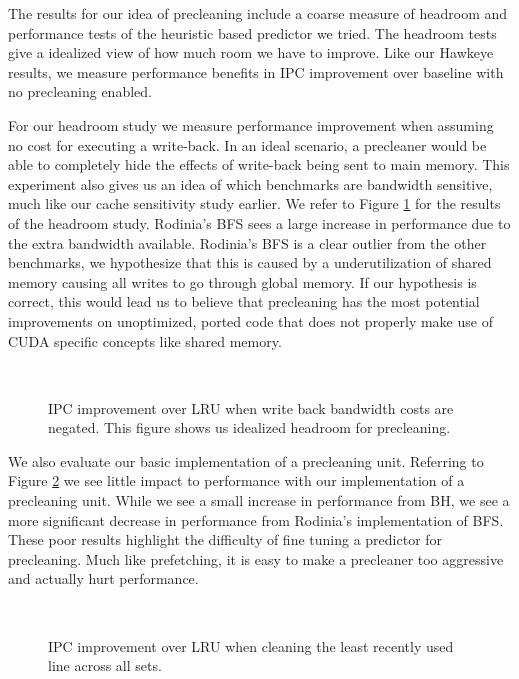 The results for our idea of precleaning include a coarse measure of headroom and performance tests of the heuristic based predictor we tried. The headroom tests give a idealized view of how much room we have to improve. Like our Hawkeye results, we measure performance benefits in IPC improvement over baseline with no precleaning enabled.

For our headroom study we measure performance improvement when assuming no cost for executing a write-back. In an ideal scenario, a precleaner would be able to completely hide the effects of write-back being sent to main memory. This experiment also gives us an idea of which benchmarks are bandwidth sensitive, much like our cache sensitivity study earlier. We refer to Figure \ref{f:preclean_headroom} for the results of the headroom study. Rodinia's BFS sees a large increase in performance due to the extra bandwidth available. Rodinia's BFS is a clear outlier from the other benchmarks, we hypothesize that this is caused by a underutilization of shared memory causing all writes to go through global memory. If our hypothesis is correct, this would lead us to believe that precleaning has the most potential improvements on unoptimized, ported code that does not properly make use of CUDA specific concepts like shared memory.

\begin{figure}[htb]
\begin{center}
\ 
\caption{IPC improvement over LRU when write back bandwidth costs are negated. This figure shows us idealized headroom for precleaning.}
\label{f:preclean_headroom}
\end{center}
\end{figure}

We also evaluate our basic implementation of a precleaning unit. Referring to Figure \ref{f:preclean_perf} we see little impact to performance with our implementation of a precleaning unit. While we see a small increase in performance from BH, we see a more significant decrease in performance from Rodinia's implementation of BFS. These poor results highlight the difficulty of fine tuning a predictor for precleaning. Much like prefetching, it is easy to make a precleaner too aggressive and actually hurt performance.

\begin{figure}[htb]
\begin{center}
\ 
\caption{IPC improvement over LRU when cleaning the least recently used line across all sets.}
\label{f:preclean_perf}
\end{center}
\end{figure}


